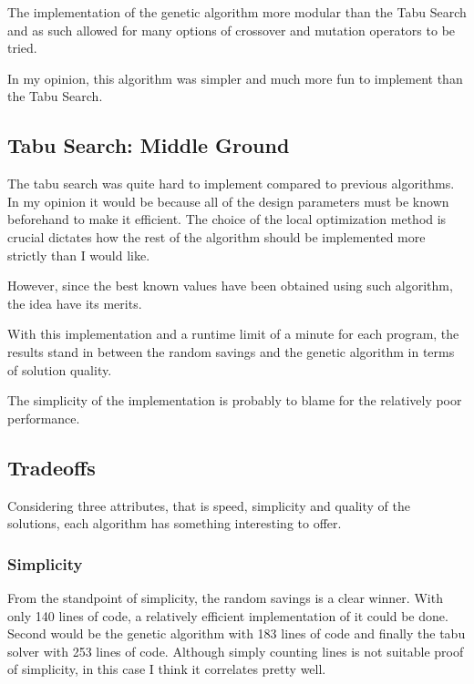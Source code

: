 \documentclass{article} %
\begin{document}
{The implementation of the genetic algorithm more modular than the Tabu Search and as such allowed for many options of crossover and mutation operators to be tried.\newline


In my opinion, this algorithm was simpler and much more fun to implement than the Tabu Search.


\subsection{Tabu Search: Middle Ground}

The tabu search was quite hard to implement compared to previous algorithms. In my opinion it would be because all of the design parameters must be known beforehand to make it efficient. The choice of the local optimization method is crucial dictates how the rest of the algorithm should be implemented more strictly than I would like.\newline

However, since the best known values have been obtained using such algorithm, the idea have its merits.\newline

With this implementation and a runtime limit of a minute for each program, the results stand in between the random savings and the genetic algorithm in terms of solution quality.\newline

The simplicity of the implementation is probably to blame for the relatively poor performance.


\subsection{Tradeoffs}

Considering three attributes, that is speed, simplicity and quality of the solutions, each algorithm has something interesting to offer.\newline


\subsubsection{Simplicity}

From the standpoint of simplicity, the random savings is a clear winner. With only 140 lines of code, a relatively efficient implementation of it could be done. Second would be the genetic algorithm with 183 lines of code and finally the tabu solver with 253 lines of code. Although simply counting lines is not suitable proof of simplicity, in this case I think it correlates pretty well.\newline


}
\end{document}
